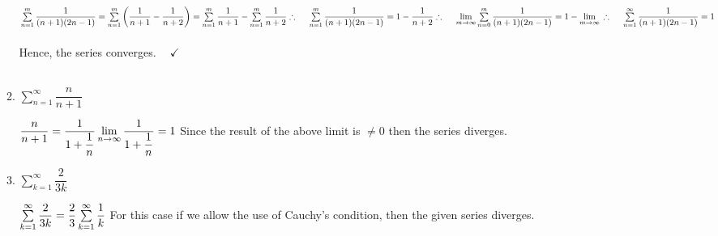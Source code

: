 \documentclass[fleqn]{article}
\begin{document}
\begin{enumerate}
\begin{enumerate}
        \textcolor{hwColor}{
          \\
          \\
          $
            \sum\limits_{n=1}^{m} \dfrac{1}{(n+1)(2n-1)}
            =\sum\limits_{n=1}^{m} \left(\dfrac{1}{n+1}-\dfrac{1}{n+2}\right)
            =\sum\limits_{n=1}^{m} \dfrac{1}{n+1}-\sum\limits_{n=1}^{m}\dfrac{1}{n+2}
            \\
            \\
            \\
            \therefore ~~~~  \sum\limits_{n=1}^{m} \dfrac{1}{(n+1)(2n-1)}=1-\dfrac{1}{n+2}
            \\
            \\
            \\
            \therefore ~~~~ \lim\limits_{m \to \infty} \sum\limits_{n=0}^{m} \dfrac{1}{(n+1)(2n-1)}
            =1-\lim\limits_{m \to \infty}
            \\
            \\
            \\
            \therefore ~~~~ \sum\limits_{n=1}^{\infty} \dfrac{1}{(n+1)(2n-1)}=1
          $
          \\
          \\
          Hence, the series converges. $~~~~ \checkmark$
          \\
          \\
        }

      \item $\sum\limits_{n=1}^{\infty} \dfrac{n}{n+1}$

        \textcolor{hwColor}{
          $
            \\
            \dfrac{n}{n+1}=\dfrac{1}{1+\dfrac{1}{n}}
            \\
            \\
            \\
            \lim\limits_{n \to \infty} \dfrac{1}{1+\dfrac{1}{n}}=1
            \\
            \\
          $
          Since the result of the above limit is $\neq 0$ then the series diverges.
          \\
        }

      \item $\sum\limits_{k=1}^{\infty} \dfrac{2}{3k}$
      
        \textcolor{hwColor}{
          $
            \sum\limits_{k=1}^{\infty} \dfrac{2}{3k}
            =\dfrac{2}{3} \sum\limits_{k=1}^{\infty} \dfrac{1}{k}
            \\
            \\
            \\
          $
          For this case if we allow the use of Cauchy's condition, then the given 
          series diverges.
          \\
          \\
        }


\end{enumerate}
\end{enumerate}
\end{document}
